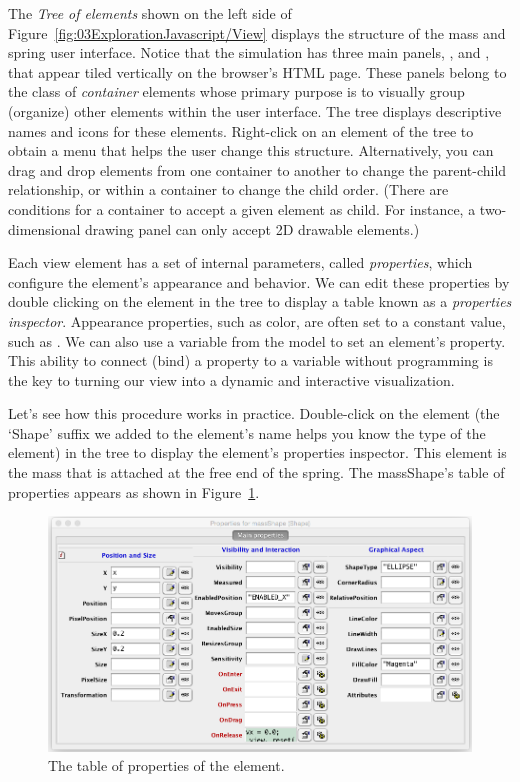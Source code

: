 The \emph{Tree of elements} shown on the left side of Figure~\ref{fig:03ExplorationJavascript/View} displays the structure of the
mass and spring user interface. Notice that the simulation has three main panels, ,  and , that appear tiled vertically on the browser's HTML page. These panels belong to the class of \emph{container} elements whose primary
purpose is to visually group (organize) other elements within the user interface.
The tree displays descriptive names and icons for these elements.   Right-click on an element of the tree to
obtain a menu that helps the user change this structure. Alternatively, you can drag and drop elements from one container to another to change the parent-child relationship, or within a container to change the child order. (There are conditions for a container to accept a given element as child. For instance, a two-dimensional drawing panel can only accept 2D drawable elements.)

Each view element has a set of internal parameters, called \emph{properties}, which
configure the element's appearance and behavior. We can edit these properties by double clicking on the element in the
tree to display a table known as a \emph{properties inspector}.  Appearance properties, such as color, are often set to a constant value, such as . We can also use a variable from the model to set an element's property. This ability to connect (bind) a property to a variable without programming is the key to turning our view into a dynamic and interactive
visualization.

Let's see how this procedure works in practice. Double-click on the  element (the `Shape' suffix we added to the element's name helps you know the type of the element) in the tree to display
the element's properties inspector. This element is the mass that is attached at the free end of the spring. The massShape's table of properties appears as shown in Figure~\ref{fig:03ExplorationJavascript/SpringBallProperties}.
\begin{figure}[htb]
    \centering
  \includegraphics[scale=\scale]{03ExplorationJavascript/images/SpringBallProperties.png}
    \caption{The table of properties of the  element.}
    \label{fig:03ExplorationJavascript/SpringBallProperties}
\end{figure}

